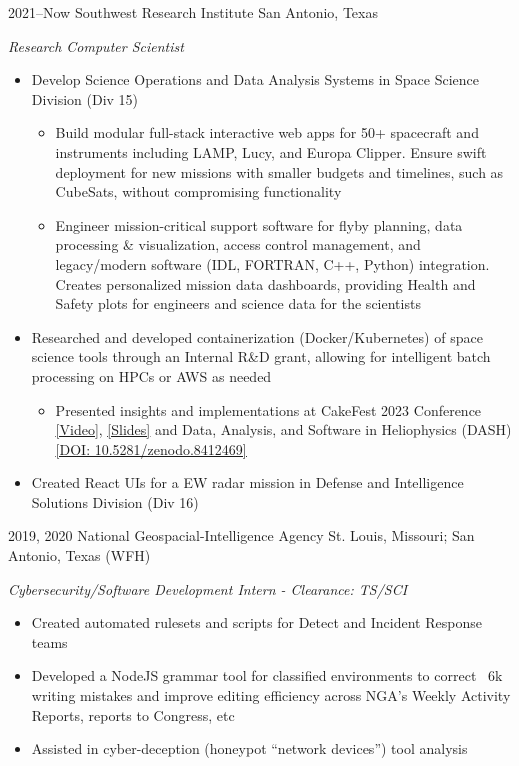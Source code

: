 \documentclass[]{friggeri-cv} %
\begin{document}
\begin{entrylist}

\entry
{2021--Now}
{Southwest Research Institute}
{San Antonio, Texas}
{\emph{Research Computer Scientist}
	\begin{itemize}
		\item Develop Science Operations and Data Analysis Systems in Space Science Division (Div 15)
		\begin{itemize}
			\item Build modular full-stack interactive web apps for 50+ spacecraft and instruments including LAMP, Lucy, and Europa Clipper. Ensure swift deployment for new missions with smaller budgets and timelines, such as CubeSats, without compromising functionality
			\item Engineer mission-critical support software for flyby planning, data processing \& visualization, access control management, and legacy/modern software (IDL, FORTRAN, C++, Python) integration. Creates personalized mission data dashboards, providing Health and Safety plots for engineers and science data for the scientists
		\end{itemize}
		\item Researched and developed containerization (Docker/Kubernetes) of space science tools through an Internal R\&D grant, allowing for intelligent batch processing on HPCs or AWS as needed
		\begin{itemize}
			\item Presented insights and implementations at CakeFest 2023 Conference \href{https://www.youtube.com/live/4KB92R7UQc8?si=sA3sVMHHHfgKZKgp&t=19699}{\underline{[Video]}}, \href{https://umer936.com/cakefest-2023}{\underline{[Slides]}} and Data, Analysis, and Software in Heliophysics (DASH) \href{https://zenodo.org/doi/10.5281/zenodo.8412468}{\underline{[DOI: 10.5281/zenodo.8412469]}}
		\end{itemize}
		\item Created React UIs for a EW radar mission in Defense and Intelligence Solutions Division (Div 16)
	\end{itemize}
}

\vspace{-5pt}

\entry
{2019, 2020}
{National Geospacial-Intelligence Agency}
{St. Louis, Missouri; San Antonio, Texas (WFH)}
{\emph{Cybersecurity/Software Development Intern - Clearance: TS/SCI}
	\begin{itemize}
		\item Created automated rulesets and scripts for Detect and Incident Response teams
		\item Developed a NodeJS grammar tool for classified environments to correct ~6k writing mistakes and improve editing efficiency across NGA's Weekly Activity Reports, reports to Congress, etc
		\item Assisted in cyber-deception (honeypot ``network devices'') tool analysis
	\end{itemize}
}
\vspace{-5pt}
	

\end{entrylist}
\end{document}
